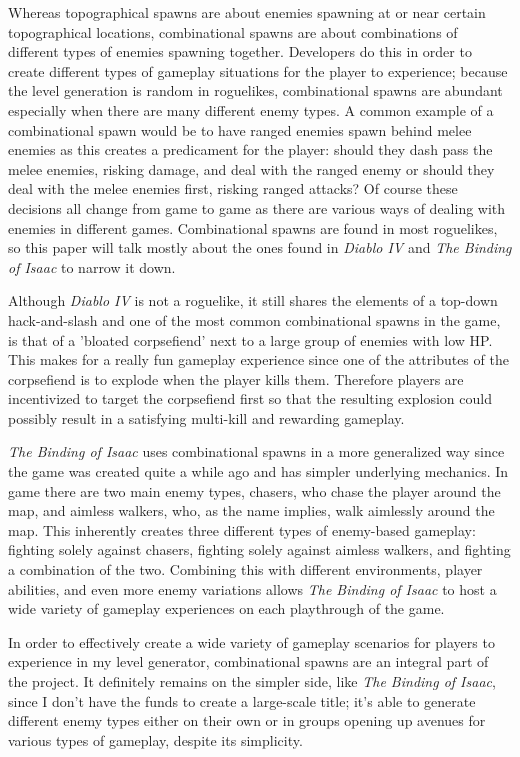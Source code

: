 \documentclass[10pt,twocolumn]{article}
\begin{document}
Whereas topographical spawns are about enemies spawning at or near certain topographical locations, combinational spawns are about combinations of different types of enemies spawning together. Developers do this in order to create different types of gameplay situations for the player to experience; because the level generation is random in roguelikes, combinational spawns are abundant especially when there are many different enemy types. A common example of a combinational spawn would be to have ranged enemies spawn behind melee enemies as this creates a predicament for the player: should they dash pass the melee enemies, risking damage, and deal with the ranged enemy or should they deal with the melee enemies first, risking ranged attacks? Of course these decisions all change from game to game as there are various ways of dealing with enemies in different games. Combinational spawns are found in most roguelikes, so this paper will talk mostly about the ones found in \textit{Diablo IV}\cite{diablo} and \textit{The Binding of Isaac}\cite{thebindingofisaac} to narrow it down. 

Although \textit{Diablo IV} is not a roguelike, it still shares the elements of a top-down hack-and-slash and one of the most common combinational spawns in the game, is that of a 'bloated corpsefiend' next to a large group of enemies with low HP. This makes for a really fun gameplay experience since one of the attributes of the corpsefiend is to explode when the player kills them. Therefore players are incentivized to target the corpsefiend first so that the resulting explosion could possibly result in a satisfying multi-kill and rewarding gameplay. 

\textit{The Binding of Isaac} uses combinational spawns in a more generalized way since the game was created quite a while ago and has simpler underlying mechanics. In game there are two main enemy types, chasers, who chase the player around the map, and aimless walkers, who, as the name implies, walk aimlessly around the map. This inherently creates three different types of enemy-based gameplay: fighting solely against chasers, fighting solely against aimless walkers, and fighting a combination of the two. Combining this with different environments, player abilities, and even more enemy variations allows \textit{The Binding of Isaac} to host a wide variety of gameplay experiences on each playthrough of the game. 

In order to effectively create a wide variety of gameplay scenarios for players to experience in my level generator, combinational spawns are an integral part of the project. It definitely remains on the simpler side, like \textit{The Binding of Isaac}, since I don't have the funds to create a large-scale title; it's able to generate different enemy types either on their own or in groups opening up avenues for various types of gameplay, despite its simplicity.
\end{document}
